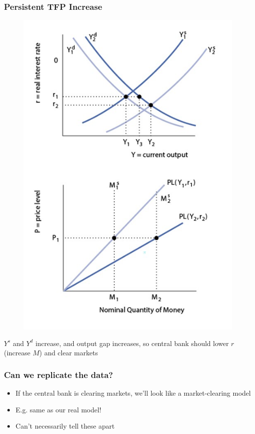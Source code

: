 \documentclass{beamer}
\begin{document}
\begin{frame}
\frametitle[alignment=center]{Persistent TFP Increase}
\begin{figure}
\centering
\includegraphics[scale=0.6]{Figures/W_Fig_14pt5.png}
\end{figure}
$Y^s$ and $Y^d$ increase, and output gap increases, so central bank should lower $r$ (increase $M$) and clear markets
\end{frame}

\begin{frame}
\frametitle[alignment=center]{Can we replicate the data? }
\begin{itemize}
\item If the central bank is clearing markets, we'll look like a market-clearing model
\bigskip
\item E.g. same as our real model!
\bigskip
\item Can't necessarily tell these apart
\end{itemize}
\end{frame}
\end{document}
